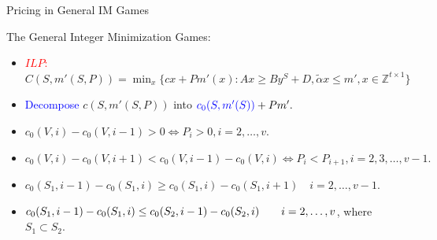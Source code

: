 \documentclass[14pt]{beamer}
\begin{document}
\begin{frame}{Pricing in General IM Games}
	\begin{definition}
	\small
	\justifying
	The General Integer Minimization Games:\\
	\begin{itemize}
	\justifying
		\item \textcolor{red}{$ILP:$}
		$C(S,m'(S,P))= \mathop{\min}_{x} \{ cx+Pm'(x): Ax \geq By^S+D, \tilde{\alpha}x \leq m', x \in \mathbb{Z}^{t \times 1} \}$
		\vspace{2pt}
		\item \textcolor{blue}{Decompose} $c(S,m'(S,P))$ into $\textcolor{blue}{c_0(S,m'(S))}+Pm'.$
		\vspace{2pt}
		\item $c_0(V,i)- c_0(V,i-1) > 0 \Leftrightarrow P_i > 0, i=2,\ldots,v.$
		\item $c_0 (V,i) - c_0 (V,i+1) < c_0 (V,i-1) - c_0 (V,i) \Leftrightarrow P_i < P_{i+1} , i=2,3,\ldots,v-1.$
		\vspace{3pt}
		\footnotesize
		\item $c_0(S_1,i-1)-c_0(S_1,i) \geq
	c_0(S_1,i)-c_0(S_1,i+1) \quad i=2,\ldots,v-1.$
		\item $	c_0(S_1,i-1)-c_0(S_1,i) \leq
		c_0(S_2,i-1)-c_0(S_2,i) \\
		\quad \quad i=2,\ldots,v$, where ~$S_1 \subset S_2$.
	\end{itemize}
	\end{definition}
\end{frame}
\end{document}
